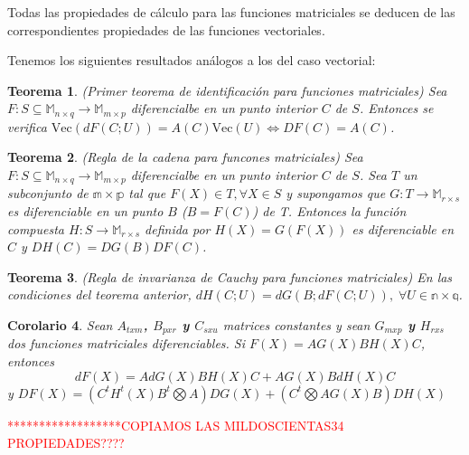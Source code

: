 \documentclass{article}
\theoremstyle{theorem-style}  %
\newtheorem{theorem}{Teorema}[section]  %
\newtheorem{corollary}[theorem]{Corolario} %
\theoremstyle{definition}
\theoremstyle{example-style}
\begin{document}
Todas las propiedades de cálculo para las funciones matriciales se deducen de las correspondientes propiedades de las funciones vectoriales.

Tenemos los siguientes resultados análogos a los del caso vectorial:

\begin{theorem} (Primer teorema de identificación para funciones matriciales)
	Sea $F:S\subseteq \mathbb{M}_{n \times q}\rightarrow \mathbb{M}_{m \times p}$ diferencialbe en un punto interior $C$ de $S$. Entonces se verifica $\text{Vec}(dF(C;U))=A(C)\text{Vec}(U) \Leftrightarrow DF(C)=A(C)$.	
\end{theorem}

\begin{theorem} (Regla de la cadena para funcones matriciales)
	Sea $F:S\subseteq \mathbb{M}_{n \times q}\rightarrow \mathbb{M}_{m \times p}$ diferencialbe en un punto interior $C$ de $S$. Sea $T$ un subconjunto de $\mathbb{m\times p}$ tal que $F(X)\in T, \forall X\in S$ y supongamos que $G:T\rightarrow \mathbb{M}_{r\times s}$ es diferenciable en un punto $B$ ($B=F(C)$) de T. Entonces la función compuesta $H:S\rightarrow \mathbb{M}_{r\times s}$ definida por $H(X)=G(F(X))$ es diferenciable en $C$ y $DH(C)=DG(B)DF(C)$.
\end{theorem}

\begin{theorem}(Regla de invarianza de Cauchy para funciones matriciales)
	En las condiciones del teorema anterior, $dH(C;U)=dG(B;dF(C;U)), \; \forall U\in \mathbb{n\times q}$.	
\end{theorem}

\begin{corollary}
	Sean \textbf{$A_{txm}$, $B_{pxr}$ y $C_{sxu}$} matrices constantes y sean \textbf{$G_{mxp}$ y $H_{rxs}$} dos funciones matriciales diferenciables. Si \textbf{$F(X) = AG(X)BH(X)C$}, entonces
	\textbf{$$ dF(X)= AdG(X)BH(X)C + AG(X)BdH(X)C $$}
	y \textbf{$DF(X)= (C^tH^t(X)B^t \bigotimes A)DG(X) + (C^t \bigotimes AG(X)B)DH(X)$} 
\end{corollary}

\textcolor{red}{******************COPIAMOS LAS MILDOSCIENTAS34 PROPIEDADES????}
\end{document}
